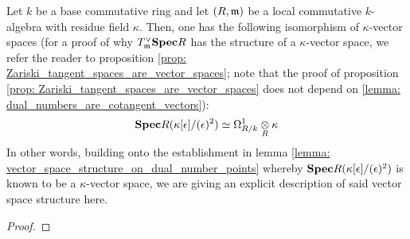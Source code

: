             \begin{lemma} \label{lemma: dual_numbers_are_cotangent_vectors} 
                Let $k$ be a base commutative ring and let $(R, \mathfrak{m})$ be a local commutative $k$-algebra with residue field $\kappa$. Then, one has the following isomorphism of $\kappa$-vector spaces (for a proof of why $T^{\vee}_{\mathfrak{m}}\mathbf{Spec} R$ has the structure of a $\kappa$-vector space, we refer the reader to proposition \ref{prop: Zariski_tangent_spaces_are_vector_spaces}; note that the proof of proposition \ref{prop: Zariski_tangent_spaces_are_vector_spaces} does not depend on \ref{lemma: dual_numbers_are_cotangent_vectors}):
                    $$\Spec R(\kappa[\e]/(\e)^2) \cong \Omega^1_{R/k} \tensor_R \kappa$$
                In other words, building onto the establishment in lemma \ref{lemma: vector_space_structure_on_dual_number_points} whereby $\mathbf{Spec} R(\kappa[\epsilon]/(\epsilon)^2)$ is known to be a $\kappa$-vector space, we are giving an explicit description of said vector space structure here.
            \end{lemma}
                \begin{proof}
                    
                \end{proof}
            
